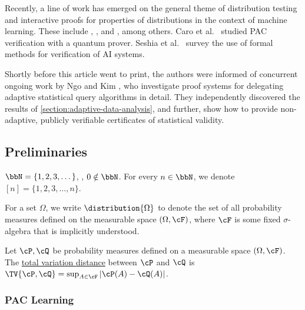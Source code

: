 Recently, %
a line of work has emerged  %
on the general theme of distribution testing and interactive proofs for properties of distributions in the context of machine learning. These include \cite{CanettiK21}, \cite{abs-2108-12099}, \cite{abs-2204-07196} and \cite{HermanR22}, among others. Caro et al.\ \cite{DBLP:journals/corr/abs-2306-04843} studied PAC verification with a quantum prover. Seshia et al.\ \cite{DBLP:journals/cacm/SeshiaSS22} survey the use of formal methods for verification of AI systems.

Shortly before this article went to print, the authors were informed of concurrent ongoing work by Ngo and Kim \cite{NgoKim}, who investigate proof systems for delegating adaptive statistical query algorithms in detail. They independently discovered the results of \cref{section:adaptive-data-analysis}, and further, show how to provide non-adaptive, publicly verifiable certificates of statistical validity.


\subsection{Preliminaries}\label{section:preliminaries}

\begin{notation}
	$\bbN = \{1,2,3,\dots\}$, \ie, $0 \notin \bbN$. For every $n \in \bbN$, we denote $[n] = \{1,2,3,\dots,n\}$.
\end{notation}

\begin{notation}
	For a set $\Omega$, we write $\distribution{\Omega}$ to denote the set of all probability measures defined on the measurable space $(\Omega,\cF)$, where $\cF$ is some fixed $\sigma$-algebra that is implicitly understood. 
\end{notation}

\begin{definition}
	Let $\cP,\cQ$ be probability measures defined on a measurable space $(\Omega,\cF)$. The \ul{total variation distance} between $\cP$ and $\cQ$ is $\TV{\cP,\cQ} = \sup_{A \in \cF} |\cP(A)-\cQ(A)|$.
\end{definition}

\subsubsection*{PAC Learning}


